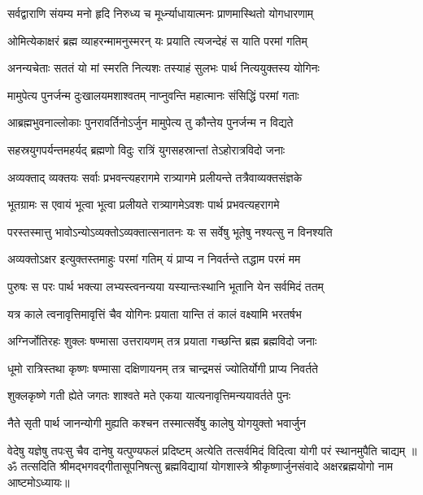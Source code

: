 \twolineshloka
{सर्वद्वाराणि संयम्य मनो हृदि निरुध्य च}
{मूर्ध्न्याधायात्मनः प्राणमास्थितो योगधारणाम्}%

\twolineshloka
{ओमित्येकाक्षरं ब्रह्म व्याहरन्मामनुस्मरन्}
{यः प्रयाति त्यजन्देहं स याति परमां गतिम्}%

\twolineshloka
{अनन्यचेताः सततं यो मां स्मरति नित्यशः}
{तस्याहं सुलभः पार्थ नित्ययुक्तस्य योगिनः}%

\twolineshloka
{मामुपेत्य पुनर्जन्म दुःखालयमशाश्वतम्}
{नाप्नुवन्ति महात्मानः संसिद्धिं परमां गताः}%

\twolineshloka
{आब्रह्मभुवनाल्लोकाः पुनरावर्तिनोऽर्जुन}
{मामुपेत्य तु कौन्तेय पुनर्जन्म न विद्यते}%

\twolineshloka
{सहस्रयुगपर्यन्तमहर्यद् ब्रह्मणो विदुः}
{रात्रिं युगसहस्रान्तां तेऽहोरात्रविदो जनाः}%

\twolineshloka
{अव्यक्ताद् व्यक्तयः सर्वाः प्रभवन्त्यहरागमे}
{रात्र्यागमे प्रलीयन्ते तत्रैवाव्यक्तसंज्ञके}%

\twolineshloka
{भूतग्रामः स एवायं भूत्वा भूत्वा प्रलीयते}
{रात्र्यागमेऽवशः पार्थ प्रभवत्यहरागमे}%

\twolineshloka
{परस्तस्मात्तु भावोऽन्योऽव्यक्तोऽव्यक्तात्सनातनः}
{यः स सर्वेषु भूतेषु नश्यत्सु न विनश्यति}%

\twolineshloka
{अव्यक्तोऽक्षर इत्युक्तस्तमाहुः परमां गतिम्}
{यं प्राप्य न निवर्तन्ते तद्धाम परमं मम}%

\twolineshloka
{पुरुषः स परः पार्थ भक्त्या लभ्यस्त्वनन्यया}
{यस्यान्तःस्थानि भूतानि येन सर्वमिदं ततम्}%

\twolineshloka
{यत्र काले त्वनावृत्तिमावृत्तिं चैव योगिनः}
{प्रयाता यान्ति तं कालं वक्ष्यामि भरतर्षभ}%

\twolineshloka
{अग्निर्जोतिरहः शुक्लः षण्मासा उत्तरायणम्}
{तत्र प्रयाता गच्छन्ति ब्रह्म ब्रह्मविदो जनाः}%

\twolineshloka
{धूमो रात्रिस्तथा कृष्णः षण्मासा दक्षिणायनम्}
{तत्र चान्द्रमसं ज्योतिर्योगी प्राप्य निवर्तते}%

\twolineshloka
{शुक्लकृष्णे गती ह्येते जगतः शाश्वते मते}
{एकया यात्यनावृत्तिमन्ययावर्तते पुनः}%

\twolineshloka
{नैते सृती पार्थ जानन्योगी मुह्यति कश्चन}
{तस्मात्सर्वेषु कालेषु योगयुक्तो भवार्जुन}%

\fourlineindentedshloka
{वेदेषु यज्ञेषु तपःसु चैव}
{दानेषु यत्पुण्यफलं प्रदिष्टम्}
{अत्येति तत्सर्वमिदं विदित्वा}
{योगी परं स्थानमुपैति चाद्यम्}%
{॥ॐ तत्सदिति श्रीमद्भगवद्गीतासूपनिषत्सु ब्रह्मविद्यायां योगशास्त्रे श्रीकृष्णार्जुनसंवादे अक्षरब्रह्मयोगो नाम आष्टमोऽध्यायः॥}

